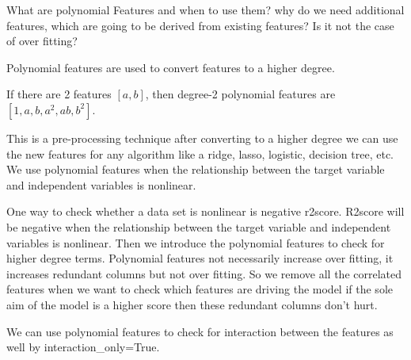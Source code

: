 	\begin{qanda}
		\begin{question}
What are polynomial Features and when to use them? why do we need additional features, which are going to be derived from existing features? Is it not the case of over fitting?
		\end{question}

		\begin{answer}
Polynomial features are used to convert features to a higher degree.

If there are 2 features $[a, b]$, then degree-2 polynomial features are $[1, a, b, a^2, ab, b^2]$.

This is a pre-processing technique after converting to a higher degree we can use the new features for any algorithm like a ridge, lasso, logistic, decision tree, etc.  We use polynomial features when the relationship between the target variable and independent variables is nonlinear.

One way to check whether a data set is nonlinear is negative r2score. R2score will be negative when the relationship between the target variable and independent variables is nonlinear. Then we introduce the polynomial features to check for higher degree terms.
Polynomial features not necessarily increase over fitting, it increases redundant columns but not over fitting. So we remove all the correlated features when we want to check which features are driving the model if the sole aim of the model is a higher score then these redundant columns don't hurt.

We can use polynomial features to check for interaction between the features as well by interaction\_only=True.
		\end{answer}
	\end{qanda}


